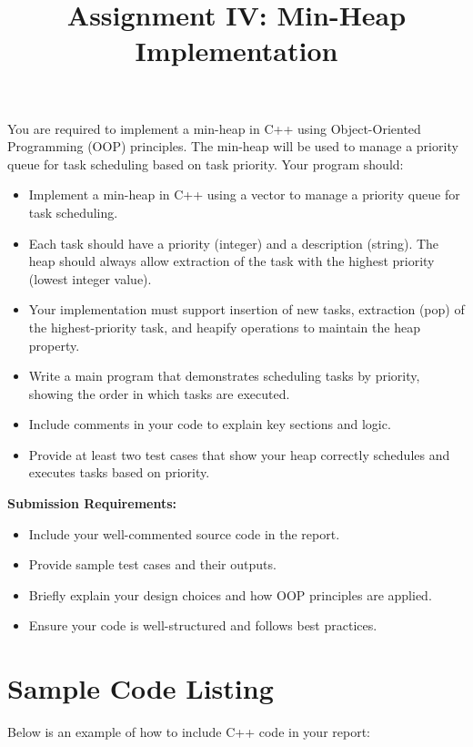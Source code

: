 \documentclass{../LatexStyle/style}
\title{\Large \bf Assignment IV: Min-Heap Implementation}
\begin{document}
\maketitle

\begin{instructions}
You are required to implement a min-heap in C++ using Object-Oriented Programming (OOP) principles. The min-heap will be used to manage a priority queue for task scheduling based on task priority.
Your program should:
    \begin{itemize}
    \item Implement a min-heap in C++ using a vector to manage a priority queue for task scheduling.
    \item Each task should have a priority (integer) and a description (string). The heap should always allow extraction of the task with the highest priority (lowest integer value).
    \item Your implementation must support insertion of new tasks, extraction (pop) of the highest-priority task, and heapify operations to maintain the heap property.
    \item Write a main program that demonstrates scheduling tasks by priority, showing the order in which tasks are executed.
    \item Include comments in your code to explain key sections and logic.
    \item Provide at least two test cases that show your heap correctly schedules and executes tasks based on priority.
\end{itemize}
    \textbf{Submission Requirements:}
    \begin{itemize}
        \item Include your well-commented source code in the report.
        \item Provide sample test cases and their outputs.
        \item Briefly explain your design choices and how OOP principles are applied.
        \item Ensure your code is well-structured and follows best practices.
    \end{itemize}
\end{instructions}





\section{Sample Code Listing}
Below is an example of how to include C++ code in your report:
\end{document}
